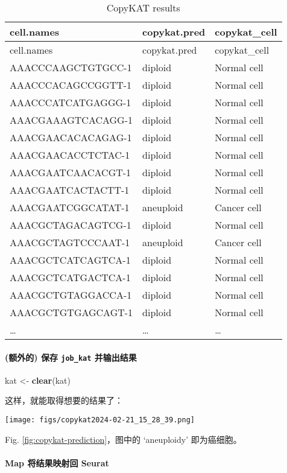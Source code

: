 \documentclass[
]{article}
\newenvironment{Shaded}{\begin{snugshade}}{\end{snugshade}}
\newcommand{\KeywordTok}[1]{\textcolor[rgb]{0.13,0.29,0.53}{\textbf{#1}}}
\newcommand{\NormalTok}[1]{#1}
\newcommand{\StringTok}[1]{\textcolor[rgb]{0.31,0.60,0.02}{#1}}
\begin{document}
\begin{longtable}[]{@{}lll@{}}
\caption{\label{tab:copyKAT-results}CopyKAT results}\tabularnewline
\toprule
cell.names & copykat.pred & copykat\_cell\tabularnewline
\midrule
\endfirsthead
\toprule
cell.names & copykat.pred & copykat\_cell\tabularnewline
\midrule
\endhead
AAACCCAAGCTGTGCC-1 & diploid & Normal cell\tabularnewline
AAACCCACAGCCGGTT-1 & diploid & Normal cell\tabularnewline
AAACCCATCATGAGGG-1 & diploid & Normal cell\tabularnewline
AAACGAAAGTCACAGG-1 & diploid & Normal cell\tabularnewline
AAACGAACACACAGAG-1 & diploid & Normal cell\tabularnewline
AAACGAACACCTCTAC-1 & diploid & Normal cell\tabularnewline
AAACGAATCAACACGT-1 & diploid & Normal cell\tabularnewline
AAACGAATCACTACTT-1 & diploid & Normal cell\tabularnewline
AAACGAATCGGCATAT-1 & aneuploid & Cancer cell\tabularnewline
AAACGCTAGACAGTCG-1 & diploid & Normal cell\tabularnewline
AAACGCTAGTCCCAAT-1 & aneuploid & Cancer cell\tabularnewline
AAACGCTCATCAGTCA-1 & diploid & Normal cell\tabularnewline
AAACGCTCATGACTCA-1 & diploid & Normal cell\tabularnewline
AAACGCTGTAGGACCA-1 & diploid & Normal cell\tabularnewline
AAACGCTGTGAGCAGT-1 & diploid & Normal cell\tabularnewline
\ldots{} & \ldots{} & \ldots{}\tabularnewline
\bottomrule
\end{longtable}

\hypertarget{clear}{%
\paragraph{\texorpdfstring{(额外的) 保存 \texttt{job\_kat} 并输出结果}{(额外的) 保存 job\_kat 并输出结果}}\label{clear}}

\begin{Shaded}
\begin{Highlighting}[]
\NormalTok{kat \textless{}{-}}\StringTok{ }\KeywordTok{clear}\NormalTok{(kat)}
\end{Highlighting}
\end{Shaded}

这样，就能取得想要的结果了：

\def\@captype{figure}
\begin{center}
\texttt{[image: figs/copykat2024-02-21\_15\_28\_39.png]}
\caption{Copykat prediction}\label{fig:copykat-prediction}
\end{center}

Fig. \ref{fig:copykat-prediction}，图中的 `aneuploidy' 即为癌细胞。

\hypertarget{map}{%
\paragraph{Map 将结果映射回 Seurat}\label{map}}
\end{document}
